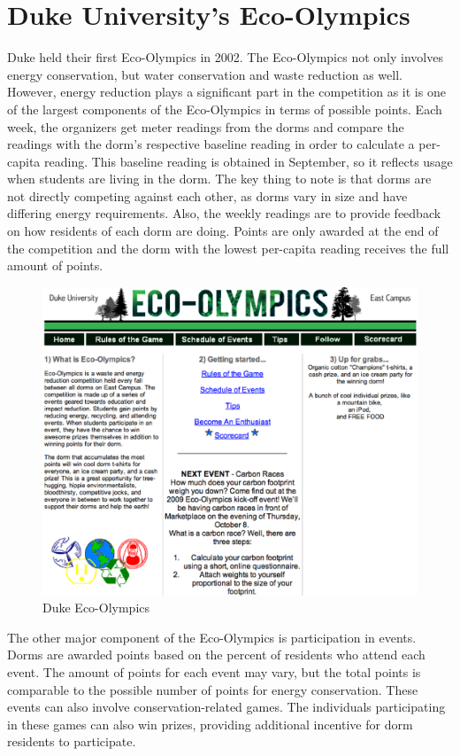 \section{Duke University's Eco-Olympics}
\label{duke-ecoolympics}

Duke held their first Eco-Olympics\cite{duke-eco-olympics} in 2002.  The Eco-Olympics not only involves energy conservation, but water conservation and waste reduction as well.  However, energy reduction plays a significant part in the competition as it is one of the largest components of the Eco-Olympics in terms of possible points.  Each week, the organizers get meter readings from the dorms and compare the readings with the dorm's respective baseline reading in order to calculate a per-capita reading.  This baseline reading is obtained in September, so it reflects usage when students are living in the dorm.   The key thing to note is that dorms are not directly competing against each other, as dorms vary in size and have differing energy requirements.  Also, the weekly readings are to provide feedback on how residents of each dorm are doing.  Points are only awarded at the end of the competition and the dorm with the lowest per-capita reading receives the full amount of points.

\begin{figure}
	\centering
	\includegraphics[scale=0.25]{images/duke-ecolympics.eps}
	\caption{Duke Eco-Olympics}
\end{figure}

The other major component of the Eco-Olympics is participation in events.  Dorms are awarded points based on the percent of residents who attend each event.  The amount of points for each event may vary, but the total points is comparable to the possible number of points for energy conservation.  These events can also involve conservation-related games.  The individuals participating in these games can also win prizes, providing additional incentive for dorm residents to participate.

